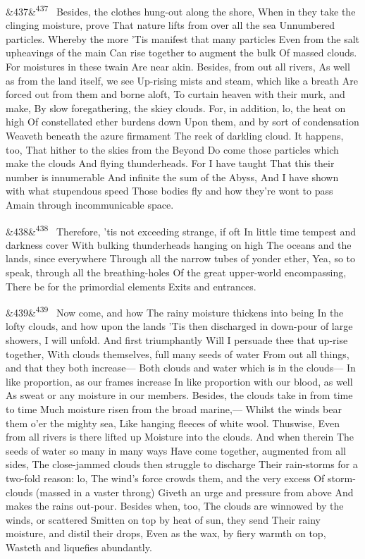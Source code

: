 \documentclass[12pt]{article}
\newcommand{\para}[1][]{\par\noindent\ifx&#1&\else\textsuperscript{\footnotesize #1}~\fi}
\begin{document}
\para[437] Besides, the clothes hung-out along the shore, When in they take the clinging moisture, prove That nature lifts from over all the sea Unnumbered particles. Whereby the more 'Tis manifest that many particles Even from the salt upheavings of the main Can rise together to augment the bulk Of massed clouds. For moistures in these twain Are near akin. Besides, from out all rivers, As well as from the land itself, we see Up-rising mists and steam, which like a breath Are forced out from them and borne aloft, To curtain heaven with their murk, and make, By slow foregathering, the skiey clouds. For, in addition, lo, the heat on high Of constellated ether burdens down Upon them, and by sort of condensation Weaveth beneath the azure firmament The reek of darkling cloud. It happens, too, That hither to the skies from the Beyond Do come those particles which make the clouds And flying thunderheads. For I have taught That this their number is innumerable And infinite the sum of the Abyss, And I have shown with what stupendous speed Those bodies fly and how they're wont to pass Amain through incommunicable space.

\para[438] Therefore, 'tis not exceeding strange, if oft In little time tempest and darkness cover With bulking thunderheads hanging on high The oceans and the lands, since everywhere Through all the narrow tubes of yonder ether, Yea, so to speak, through all the breathing-holes Of the great upper-world encompassing, There be for the primordial elements Exits and entrances.

\para[439] Now come, and how The rainy moisture thickens into being In the lofty clouds, and how upon the lands 'Tis then discharged in down-pour of large showers, I will unfold. And first triumphantly Will I persuade thee that up-rise together, With clouds themselves, full many seeds of water From out all things, and that they both increase--- Both clouds and water which is in the clouds--- In like proportion, as our frames increase In like proportion with our blood, as well As sweat or any moisture in our members. Besides, the clouds take in from time to time Much moisture risen from the broad marine,--- Whilst the winds bear them o'er the mighty sea, Like hanging fleeces of white wool. Thuswise, Even from all rivers is there lifted up Moisture into the clouds. And when therein The seeds of water so many in many ways Have come together, augmented from all sides, The close-jammed clouds then struggle to discharge Their rain-storms for a two-fold reason: lo, The wind's force crowds them, and the very excess Of storm-clouds (massed in a vaster throng) Giveth an urge and pressure from above And makes the rains out-pour. Besides when, too, The clouds are winnowed by the winds, or scattered Smitten on top by heat of sun, they send Their rainy moisture, and distil their drops, Even as the wax, by fiery warmth on top, Wasteth and liquefies abundantly.
\end{document}

